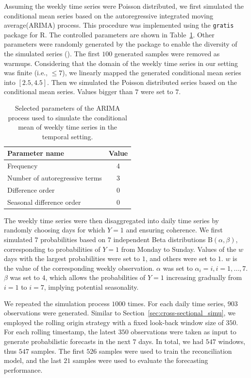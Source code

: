 \documentclass[a4paper,review,12pt,authoryear]{elsarticle}
\let\code=\texttt
\let\proglang=\textsf
\begin{document}
     Assuming the weekly time series were Poisson distributed, we first simulated the conditional mean series based on the autoregressive integrated moving average(ARIMA)  process. This procedure was implemented using the \code{gratis} package for \proglang{R}. 
     The controlled parameters are shown in Table~\ref{tab:parameters}. Other parameters were randomly generated by the package to enable the diversity of the simulated series (). 
     The first $100$ generated samples were removed as warmups.
     Considering that the domain of the weekly time series in our setting was finite (i.e., $\leq 7$), we linearly mapped the generated conditional mean series into $[2.5, 4.5]$. 
     Then we simulated the Poisson distributed series based on the conditional mean series. Values bigger than $7$ were set to $7$.
     
     \begin{table}[h]
       \centering
       \caption{\label{tab:parameters} Selected parameters of the ARIMA process used to simulate the conditional mean of weekly time series in the temporal setting.}
       \begin{tabular}{lc}
         \toprule
         Parameter name & Value \\ \midrule
         Frequency & 4 \\
         Number of autoregressive terms & 3 \\
         Difference order & 0 \\
         Seasonal difference order & 0 \\ \bottomrule
       \end{tabular}
     \end{table}
     
     The weekly time series were then disaggregated into daily time series by randomly choosing days for which $Y=1$ and ensuring coherence. 
     We first simulated $7$ probabilities based on $7$ independent Beta distributions $\textrm{B}(\alpha, \beta)$, corresponding to probabilities of $Y=1$ from Monday to Sunday. 
     Values of the $w$ days with the largest probabilities were set to $1$, and others were set to $1$. $w$ is the value of the corresponding weekly observation.
     $\alpha$ was set to $\alpha_i = i, i=1,\dots,7$. $\beta$ was set to $4$, which allows the probabilities of $Y=1$ increasing gradually from $i=1$ to $i=7$, implying potential seasonality.
     
     We repeated the simulation process $1000$ times. For each daily time series, $903$ observations were generated. Similar to Section~\ref{sec:cross-sectional_simu}, we employed the rolling origin strategy with a fixed look-back window size of $350$. 
     For each rolling timestamp, the latest $350$ observations were taken as input to generate probabilistic forecasts in the next $7$ days. 
     In total, we had $547$ windows, thus $547$ samples.
     The first $526$ samples were used to train the reconciliation model, and the last $21$ samples were used to evaluate the forecasting performance.
     
\end{document}
